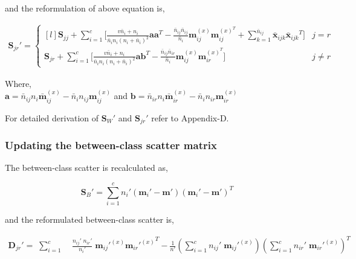 \noindent
and the reformulation of above equation is, 

\begin{equation}
\label{eqn:3Sjr}
\begin{split}
\textbf{S}_{jr}' = \left\{\begin{matrix*}[l]
\textbf{S}_{jj} + \sum\limits_{i=1}^{c} \bigg[ \frac{v \bar{n}_i + n_i}{\bar{n}_i n_i (n_i + \bar{n}_i)^2} \textbf{a} \textbf{a}^T - \frac{\bar{n}_{ij} \bar{n}_{ij}}{\bar{n}_i} \textbf{m}_{ij}^{(x)} \textbf{m}_{ij}^{(x)^T} + \sum\limits_{k=1}^{\bar{n}_{ij}} \bar{\textbf{x}}_{ijk} {\bar{\textbf{x}}_{ijk}}^T \bigg] & j=r \\[0.4cm]
\textbf{S}_{jr} + \sum\limits_{i=1}^{c} \bigg[ \frac{v \bar{n}_i + n_i}{\bar{n}_i n_i (n_i + \bar{n}_i)^2} \textbf{a} \textbf{b}^T - \frac{\bar{n}_{ij} \bar{n}_{ir}}{\bar{n}_i} \textbf{m}_{ij}^{(x)} \textbf{m}_{ir}^{(x)^T} \bigg] & j \neq r
\end{matrix*}\right.
\end{split}
\end{equation}

\noindent
Where,\\
$\textbf{a} = \bar{n}_{ij} n_i \bar{\textbf{m}}_{ij}^{(x)} - \bar{n}_i n_{ij} \textbf{m}_{ij}^{(x)}$ and $\textbf{b} = \bar{n}_{ir} n_i \bar{\textbf{m}}_{ir}^{(x)} - \bar{n}_i n_{ir} \textbf{m}_{ir}^{(x)}$

\noindent
For detailed derivation of $\textbf{S}_{W}'$ and $\textbf{S}_{jr}'$ refer to Appendix-D.%



\subsubsection{Updating the between-class scatter matrix}
\label{ssubs:MvIDA_ChkEC_Sb}
The between-class scatter is recalculated as,

\begin{equation}
\label{eqn:3Sb}
\textbf{S}_B' = \sum_{i=1}^{c} n_{i}' (\textbf{m}_{i}' - \textbf{m}') (\textbf{m}_{i}' - \textbf{m}')^T
\end{equation}

\noindent
and the reformulated between-class scatter is,

\begin{equation}
\label{eqn:3Djr}
\begin{split}
\textbf{D}_{jr}' = \; \sum_{i=1}^{c} & \; \frac{n_{ij}' \; n_{ir}'}{n_{i}'} \; {\textbf{m}_{ij}'}^{(x)} {{\textbf{m}_{ir}'}^{(x)}}^T - \frac{1}{n'} \left (\sum_{i=1}^{c} n_{ij}' \; {\textbf{m}_{ij}'}^{(x)} \right ) \left (\sum_{i=1}^{c} n_{ir}' \; {{\textbf{m}_{ir}'}^{(x)}} \right )^T
\end{split}
\end{equation}





